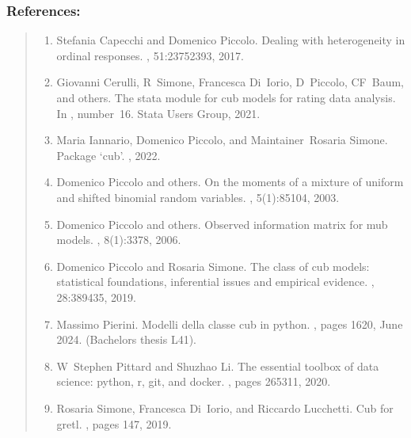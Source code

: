 \documentclass[letterpaper,10pt,english]{sphinxmanual}
\begin{document}
\subsubsection{References:}
\label{\detokenize{cubmods:id203}}\begin{quote}
\begin{enumerate}
%
\setcounter{enumi}{0}
\item {} 
\sphinxAtStartPar
Stefania Capecchi and Domenico Piccolo. Dealing with heterogeneity in ordinal responses. , 51:2375\textendash{}2393, 2017.

\item {} 
\sphinxAtStartPar
Giovanni Cerulli, R Simone, Francesca Di Iorio, D Piccolo, CF Baum, and others. The stata module for cub models for rating data analysis. In , number 16. Stata Users Group, 2021.

\item {} 
\sphinxAtStartPar
Maria Iannario, Domenico Piccolo, and Maintainer Rosaria Simone. Package ‘cub’. , 2022.

\item {} 
\sphinxAtStartPar
Domenico Piccolo and others. On the moments of a mixture of uniform and shifted binomial random variables. , 5(1):85\textendash{}104, 2003.

\item {} 
\sphinxAtStartPar
Domenico Piccolo and others. Observed information matrix for mub models. , 8(1):33\textendash{}78, 2006.

\item {} 
\sphinxAtStartPar
Domenico Piccolo and Rosaria Simone. The class of cub models: statistical foundations, inferential issues and empirical evidence. , 28:389\textendash{}435, 2019.

\item {} 
\sphinxAtStartPar
Massimo Pierini. Modelli della classe cub in python. , pages 16\textendash{}20, June 2024. (Bachelor\textquotesingle{}s thesis L\sphinxhyphen{}41).

\item {} 
\sphinxAtStartPar
W Stephen Pittard and Shuzhao Li. The essential toolbox of data science: python, r, git, and docker. , pages 265\textendash{}311, 2020.

\item {} 
\sphinxAtStartPar
Rosaria Simone, Francesca Di Iorio, and Riccardo Lucchetti. Cub for gretl. , pages 147, 2019.

\end{enumerate}
\end{quote}
\end{document}
